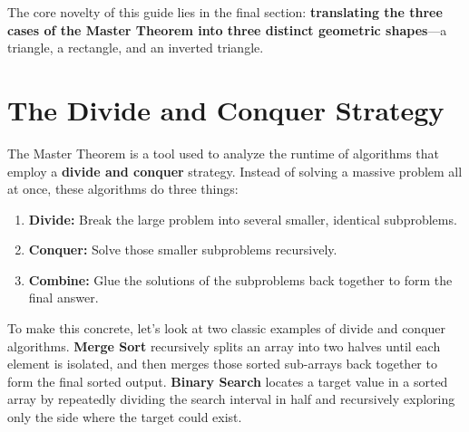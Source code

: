 The core novelty of this guide lies in the final section: \textbf{translating the three cases of the Master Theorem into three distinct geometric shapes}—a triangle, a rectangle, and an inverted triangle.

\section{The Divide and Conquer Strategy}

The Master Theorem is a tool used to analyze the runtime of algorithms that employ a \textbf{divide and conquer} strategy. Instead of solving a massive problem all at once, these algorithms do three things:
\begin{enumerate}
    \item \textbf{Divide:} Break the large problem into several smaller, identical subproblems.
    \item \textbf{Conquer:} Solve those smaller subproblems recursively.
    \item \textbf{Combine:} Glue the solutions of the subproblems back together to form the final answer.
\end{enumerate}
To make this concrete, let's look at two classic examples of divide and conquer algorithms. \textbf{Merge Sort} recursively splits an array into two halves until each element is isolated, and then merges those sorted sub-arrays back together to form the final sorted output. \textbf{Binary Search} locates a target value in a sorted array by repeatedly dividing the search interval in half and recursively exploring only the side where the target could exist.

